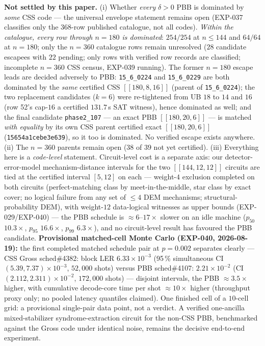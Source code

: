 \documentclass[11pt]{article}
\newcommand{\nk}[1]{[\![#1]\!]}
\theoremstyle{plain}
\theoremstyle{remark}
\begin{document}
\textbf{Not settled by this paper.} (i) Whether \emph{every} $\delta>0$ PBB is dominated by \emph{some}
CSS code --- the universal envelope statement remains open (EXP-037 classifies only
the 368-row published catalogue, not all codes). \emph{Within the catalogue, every
row through $n=180$ is dominated}: $254/254$ at $n\le144$ and $64/64$ at
$n=180$; only the $n=360$ catalogue rows remain unresolved ($28$ candidate
escapees with $22$ pending; only rows with
verified row records are classified; incomplete $n=360$ CSS census,
EXP-039 running). The former $n=180$ escape leads are decided adversely to PBB:
\texttt{15\_6\_0224} and \texttt{15\_6\_0229} are both dominated by the \emph{same}
certified CSS $\nk{180,8,16}$ (parent of \texttt{15\_6\_0224}); the two replacement
candidates ($k=6$) were re-tightened from UB $18$ to $14$ and $16$ (row 52's cap-$16$
a certified $131.7$\,s SAT witness), hence dominated as well; and the final candidate
\texttt{phase2\_107} --- an exact PBB $\nk{180,20,6}$ --- is matched \emph{with
equality} by its own CSS parent certified exact $\nk{180,20,6}$
(\texttt{15654a1cebe3e639}), so it too is dominated. No verified escape exists
anywhere.
(ii) The $n=360$ parents remain open ($38$ of $39$ not yet certified). (iii) Everything here is
a \emph{code-level} statement. Circuit-level cost is a separate axis: our detector-error-model
mechanism-distance intervals for the two $\nk{144,12,12}$ circuits are tied at the certified interval $[5,12]$ on each --- weight-$4$ exclusion completed on both circuits (perfect-matching class by meet-in-the-middle, star class by exact cover; no logical failure from any set of $\le4$ DEM mechanisms; structural-probability DEM), with weight-$12$ data-logical witnesses as upper bounds (EXP-029/EXP-040) --- the PBB
schedule is $\approx 6$--$17\times$ slower on an idle machine ($p_{50}$ $10.3\times$,
$p_{95}$ $16.6\times$, $p_{99}$ $6.3\times$), and no circuit-level result has favoured the
PBB candidate. \textbf{Provisional matched-cell Monte Carlo (EXP-040, 2026-08-19):}
the first completed matched schedule pair at $p=0.002$ separates clearly --- CSS Gross
sched\#4382: block LER $6.33\times10^{-3}$ (95\,\% simultaneous CI
$(5.39,7.37)\times10^{-3}$, $52{,}000$ shots) versus PBB sched\#4107:
$2.21\times10^{-2}$ (CI $(2.112,2.311)\times10^{-2}$, $172{,}000$ shots) --- disjoint
intervals, the PBB $\approx3.5\times$ higher, with cumulative decode-core time per
shot $\approx10\times$ higher (throughput proxy only; no pooled latency quantiles
claimed). One finished cell of a $10$-cell grid: a provisional single-pair data
point, not a verdict.
A verified one-ancilla mixed-stabilizer syndrome-extraction circuit for
the non-CSS PBB, benchmarked against the Gross code under identical noise, remains the
decisive end-to-end experiment.
\end{document}
